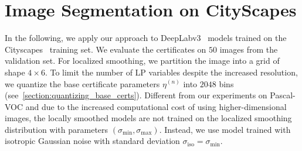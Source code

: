 \appendix

\startcontents[section]

\clearpage



\section{Image Segmentation on CityScapes}\label{section:extra_experiments_cityscapes}

In the following, we apply our approach to DeepLabv3~\citep{Chen2017} models trained on the Cityscapes~\citep{Cordts2016} training set. We evaluate the certificates on $50$ images from the validation set.
For localized smoothing, we partition the image into a grid of shape $4 \times 6$.
To limit the number of LP variables despite the increased
resolution, we quantize the base certificate parameters $\eta^{(n)}$ into $2048$ bins (see~\autoref{section:quantizing_base_certs}).
Different from our experiments on Pascal-VOC and due to the increased computational cost of using higher-dimensional images, the locally smoothed models are not trained on the localized smoothing distribution with parameters $(\sigma_\mathrm{min}, \sigma_\mathrm{max})$.
Instead, we use model trained with isotropic Gaussian noise with standard deviation $\sigma_\mathrm{iso} = \sigma_\mathrm{min}$.

